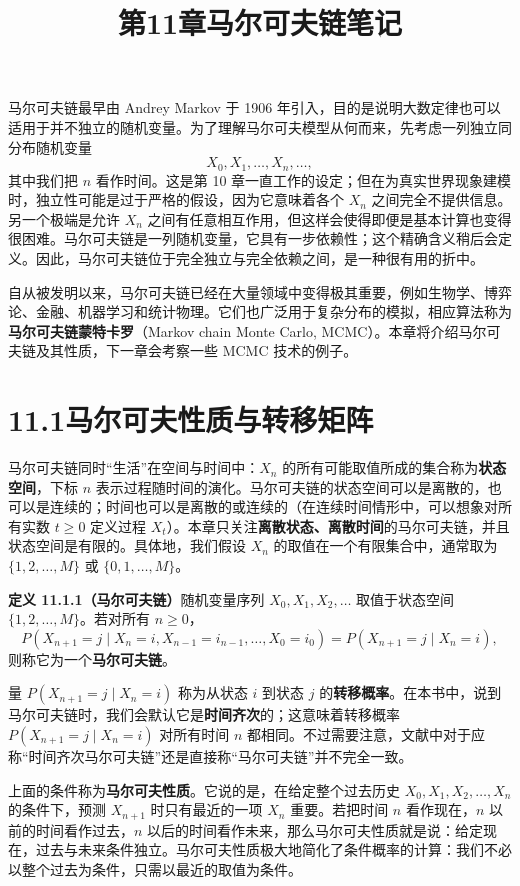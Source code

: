 \documentclass[UTF8,12pt,a4paper,fontset=fandol]{ctexart}
\title{第11章\quad 马尔可夫链笔记}
\author{}
\date{}
\begin{document}
\maketitle

马尔可夫链最早由 Andrey Markov 于 1906 年引入，目的是说明大数定律也可以适用于并不独立的随机变量。为了理解马尔可夫模型从何而来，先考虑一列独立同分布随机变量
\[
  X_0,X_1,\ldots,X_n,\ldots,
\]
其中我们把 $n$ 看作时间。这是第 10 章一直工作的设定；但在为真实世界现象建模时，独立性可能是过于严格的假设，因为它意味着各个 $X_n$ 之间完全不提供信息。另一个极端是允许 $X_n$ 之间有任意相互作用，但这样会使得即便是基本计算也变得很困难。马尔可夫链是一列随机变量，它具有一步依赖性；这个精确含义稍后会定义。因此，马尔可夫链位于完全独立与完全依赖之间，是一种很有用的折中。

自从被发明以来，马尔可夫链已经在大量领域中变得极其重要，例如生物学、博弈论、金融、机器学习和统计物理。它们也广泛用于复杂分布的模拟，相应算法称为\textbf{马尔可夫链蒙特卡罗}（Markov chain Monte Carlo, MCMC）。本章将介绍马尔可夫链及其性质，下一章会考察一些 MCMC 技术的例子。

\section*{11.1\quad 马尔可夫性质与转移矩阵}

马尔可夫链同时“生活”在空间与时间中：$X_n$ 的所有可能取值所成的集合称为\textbf{状态空间}，下标 $n$ 表示过程随时间的演化。马尔可夫链的状态空间可以是离散的，也可以是连续的；时间也可以是离散的或连续的（在连续时间情形中，可以想象对所有实数 $t\ge 0$ 定义过程 $X_t$）。本章只关注\textbf{离散状态、离散时间}的马尔可夫链，并且状态空间是有限的。具体地，我们假设 $X_n$ 的取值在一个有限集合中，通常取为 $\{1,2,\ldots,M\}$ 或 $\{0,1,\ldots,M\}$。

\noindent\textbf{定义 11.1.1（马尔可夫链）}\quad 随机变量序列 $X_0,X_1,X_2,\ldots$ 取值于状态空间 $\{1,2,\ldots,M\}$。若对所有 $n\ge0$，
\[
  P(X_{n+1}=j\mid X_n=i,X_{n-1}=i_{n-1},\ldots,X_0=i_0)
  =
  P(X_{n+1}=j\mid X_n=i),
\]
则称它为一个\textbf{马尔可夫链}。

量 $P(X_{n+1}=j\mid X_n=i)$ 称为从状态 $i$ 到状态 $j$ 的\textbf{转移概率}。在本书中，说到马尔可夫链时，我们会默认它是\textbf{时间齐次}的；这意味着转移概率 $P(X_{n+1}=j\mid X_n=i)$ 对所有时间 $n$ 都相同。不过需要注意，文献中对于应称“时间齐次马尔可夫链”还是直接称“马尔可夫链”并不完全一致。

上面的条件称为\textbf{马尔可夫性质}。它说的是，在给定整个过去历史 $X_0,X_1,X_2,\ldots,X_n$ 的条件下，预测 $X_{n+1}$ 时只有最近的一项 $X_n$ 重要。若把时间 $n$ 看作现在，$n$ 以前的时间看作过去，$n$ 以后的时间看作未来，那么马尔可夫性质就是说：给定现在，过去与未来条件独立。马尔可夫性质极大地简化了条件概率的计算：我们不必以整个过去为条件，只需以最近的取值为条件。
\end{document}
